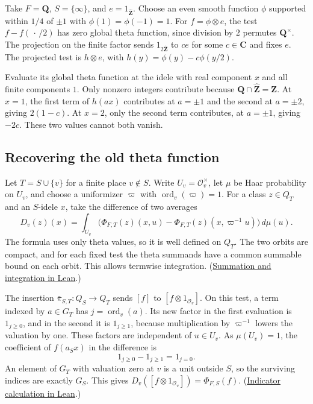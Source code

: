 Take \(F=\mathbf Q\), \(S=\{\infty\}\), and \(e=1_{\widehat{\mathbf Z}}\).
Choose an even smooth function \(\phi\) supported within \(1/4\) of \(\pm1\)
with \(\phi(1)=\phi(-1)=1\). For \(f=\phi\otimes e\), the test
\(f-f(\,\cdot\,/2)\) has zero global theta function, since division by \(2\)
permutes \(\mathbf Q^\times\). The projection on the finite factor sends
\(1_{2\widehat{\mathbf Z}}\) to \(c e\) for some \(c\in\mathbf C\) and fixes
\(e\). The projected test is \(h\otimes e\), with \(h(y)=\phi(y)-c\phi(y/2)\).

Evaluate its global theta function at the idele with real component \(x\)
and all finite components \(1\). Only nonzero integers contribute because
\(\mathbf Q\cap\widehat{\mathbf Z}=\mathbf Z\). At \(x=1\), the first term of
\(h(ax)\) contributes at \(a=\pm1\) and the second at \(a=\pm2\), giving
\(2(1-c)\). At \(x=2\), only the second term contributes, at \(a=\pm1\),
giving \(-2c\). These two values cannot both vanish.

\subsection{Recovering the old theta function}

Let \(T=S\cup\{v\}\) for a finite place \(v\notin S\). Write
\(U_v=\mathcal O_v^\times\), let \(\mu\) be Haar probability on \(U_v\), and choose a
uniformizer \(\varpi\) with \(\operatorname{ord}_v(\varpi)=1\). For a class
\(z\in Q_T\) and an \(S\)-idele \(x\), take the difference of two averages
\begin{equation}
  D_v(z)(x)=\int_{U_v}
    \bigl(\Phi_{F,T}(z)(x,u)-\Phi_{F,T}(z)(x,\varpi^{-1}u)\bigr)
    \,d\mu(u).
  \label{5-2-1-1-3-theta-embedding:average}
\end{equation}
The formula uses only theta values, so it is well defined on \(Q_T\).
The two orbits are compact, and for each fixed test the theta summands have
a common summable bound on each orbit. This allows termwise integration.
(\href{https://github.com/mccorvie/riemann-masullo/blob/ac7e1cde68ff1fac01ecbef3c0e9f48e46bc1f06/RiemannMasullo/Ch05_ThetaZSpaces/Sec2.lean#L3506-L3530}{Summation and integration in Lean}.)

The insertion \(\bar\pi_{S,T}\colon Q_S\to Q_T\) sends \([f]\) to
\([f\otimes 1_{\mathcal O_v}]\). On this test, a term indexed by
\(a\in G_T\) has \(j=\operatorname{ord}_v(a)\). Its new factor in the first
evaluation is \(1_{j\geq 0}\), and in the second it is \(1_{j\geq 1}\),
because multiplication by \(\varpi^{-1}\) lowers the valuation by one.
These factors are independent of \(u\in U_v\). As \(\mu(U_v)=1\), the
coefficient of \(f(a_S x)\) in the difference is
\[
  1_{j\geq 0}-1_{j\geq 1}=1_{j=0}.
\]
An element of \(G_T\) with valuation zero at \(v\) is a unit outside \(S\),
so the surviving indices are exactly \(G_S\). This gives
\(D_v([f\otimes 1_{\mathcal O_v}])=\Phi_{F,S}(f)\).
(\href{https://github.com/mccorvie/riemann-masullo/blob/ac7e1cde68ff1fac01ecbef3c0e9f48e46bc1f06/RiemannMasullo/Ch05_ThetaZSpaces/Sec2.lean#L3924-L3944}{Indicator calculation in Lean}.)

